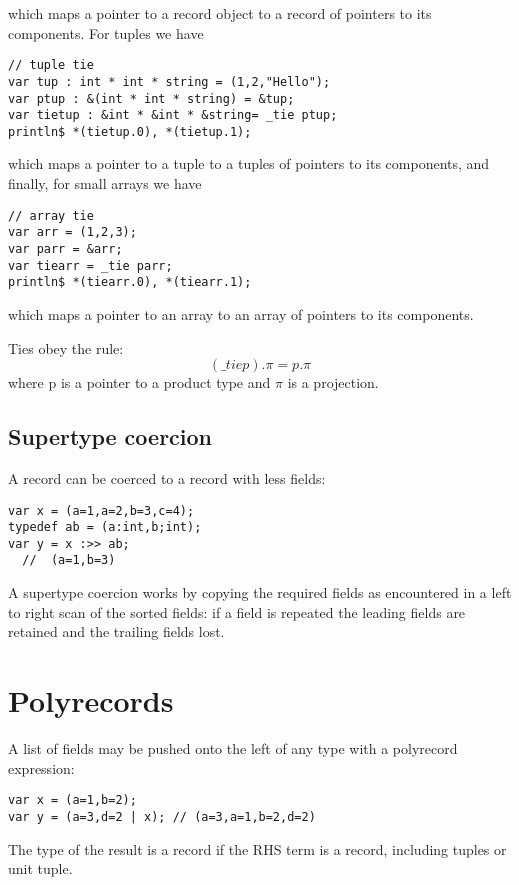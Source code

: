 \documentclass{article}
\begin{document}
which maps a pointer to a record object to a record of pointers to its
components. For tuples we have

\begin{verbatim}
// tuple tie
var tup : int * int * string = (1,2,"Hello");
var ptup : &(int * int * string) = &tup;
var tietup : &int * &int * &string= _tie ptup;
println$ *(tietup.0), *(tietup.1);
\end{verbatim}

which maps a pointer to a tuple to a tuples of pointers to its
components, and finally, for small arrays we have

\begin{verbatim}
// array tie
var arr = (1,2,3);
var parr = &arr;
var tiearr = _tie parr;
println$ *(tiearr.0), *(tiearr.1);
\end{verbatim}

which maps a pointer to an array to an array of pointers to its components.

Ties obey the rule:
$$ ({\mathrm \_tie} p) . \pi = p . \pi$$
where p is a pointer to a product type and $\pi$ is a projection.

\subsection{Supertype coercion}
A record can be coerced to a record with less fields:

\begin{verbatim}
var x = (a=1,a=2,b=3,c=4);
typedef ab = (a:int,b;int);
var y = x :>> ab; 
  //  (a=1,b=3)
\end{verbatim}

A supertype coercion works by copying the required fields
as encountered in a left to right scan of the sorted fields:
if a field is repeated the leading fields are retained
and the trailing fields lost.

\section{Polyrecords}
A list of fields may be pushed onto the left of any 
type with a polyrecord expression:

\begin{verbatim}
var x = (a=1,b=2);
var y = (a=3,d=2 | x); // (a=3,a=1,b=2,d=2)
\end{verbatim}

The type of the result is a record if the RHS term is a record, including
tuples or unit tuple. 
\end{document}
